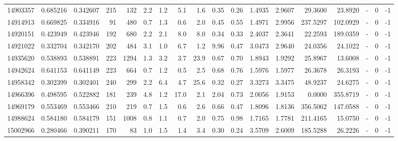 \begin{tabular}{rrrrrrrrrrrrrrrlrr}
  14903357 & 0.685216 &   0.342607 &  215 &  132 &      2.2 &      1.2 &     5.1 &      1.6 &       0.35 &        0.26 &  1.4935 &  2.9607 &   29.3600 &   23.8920 &             - &        0 &         -1 \\
  14914913 & 0.669825 &   0.334916 &   91 &  480 &      0.7 &      1.3 &     0.6 &      2.0 &       0.45 &        0.55 &  1.4971 &  2.9956 &  237.5297 &  102.0929 &             - &        0 &         -1 \\
  14920151 & 0.423949 &   0.423946 &  192 &  680 &      2.2 &      2.1 &     8.0 &      8.0 &       0.34 &        0.33 &  2.4037 &  2.3641 &   22.2593 &  189.0359 &             - &        0 &         -1 \\
  14921022 & 0.332704 &   0.342170 &  202 &  484 &      3.1 &      1.0 &     6.7 &      1.2 &       9.96 &        0.47 &  3.0473 &  2.9640 &   24.0356 &   24.1022 &             - &        0 &         -1 \\
  14935620 & 0.538893 &   0.538891 &  223 & 1294 &      1.3 &      3.2 &     3.7 &     23.9 &       0.67 &        0.70 &  1.8943 &  1.9292 &   25.8967 &   13.6008 &             - &        0 &         -1 \\
  14942624 & 0.641153 &   0.641149 &  223 &  664 &      0.7 &      1.2 &     0.5 &      2.5 &       0.68 &        0.76 &  1.5976 &  1.5977 &   26.3678 &   26.3193 &             - &        0 &         -1 \\
  14958342 & 0.302399 &   0.302401 &  240 &  299 &      2.2 &      6.4 &     4.7 &     25.6 &       0.32 &        0.27 &  3.3273 &  3.3475 &   48.9237 &   24.6275 &             - &        0 &         -1 \\
  14966396 & 0.498595 &   0.522882 &  181 &  239 &      4.8 &      1.2 &    17.0 &      2.1 &       2.04 &        0.73 &  2.0056 &  1.9153 &    0.0000 &  355.8719 &             - &        0 &         -1 \\
  14969179 & 0.553469 &   0.553466 &  210 &  219 &      0.7 &      1.5 &     0.6 &      2.6 &       0.66 &        0.47 &  1.8096 &  1.8136 &  356.5062 &  147.0588 &             - &        0 &         -1 \\
  14988624 & 0.584180 &   0.584179 &  151 & 1008 &      0.8 &      1.1 &     0.7 &      2.0 &       0.75 &        0.98 &  1.7165 &  1.7781 &  211.4165 &   15.0750 &             - &        0 &         -1 \\
  15002966 & 0.280466 &   0.390211 &  170 &   83 &      1.0 &      1.5 &     1.4 &      3.4 &       0.30 &        0.24 &  3.5709 &  2.6009 &  185.5288 &   26.2226 &             - &        0 &         -1 \\

\end{tabular}
